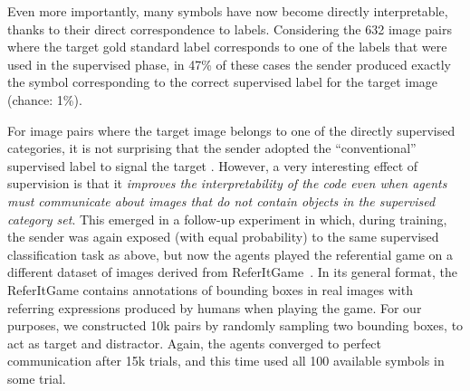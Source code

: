 Even more importantly, many symbols have now become directly
interpretable, thanks to their direct correspondence to
labels. Considering the 632 image pairs where the target gold
standard label corresponds to one of the labels that were used in the
supervised phase, in 47\% of these cases the sender produced exactly
the symbol corresponding to the correct supervised label for the
target image (chance: 1\%). %


For image pairs where the target image belongs to one of the directly
supervised categories, it is not surprising that the sender adopted
the ``conventional'' supervised label to signal the target . However,
a very interesting effect of supervision is that it \emph{improves the
  interpretability of the code even when agents must communicate about
  images that do not contain objects in the supervised category
  set}. This emerged in a follow-up experiment in which, during
training, the sender was again exposed (with equal probability) to the
same supervised classification task as above, but now the agents %
played the referential game on a different dataset of images derived
from ReferItGame~\citep{Kazemzadeh:etal:2014}.  In its general format,
the ReferItGame contains annotations of bounding boxes in real images
with referring expressions produced by humans when playing the
game. %
For our purposes, we constructed 10k pairs by randomly sampling two
bounding boxes, to act as target and distractor.  Again, the agents
converged to perfect communication after 15k trials, and this time
used all 100 available symbols in some trial.

